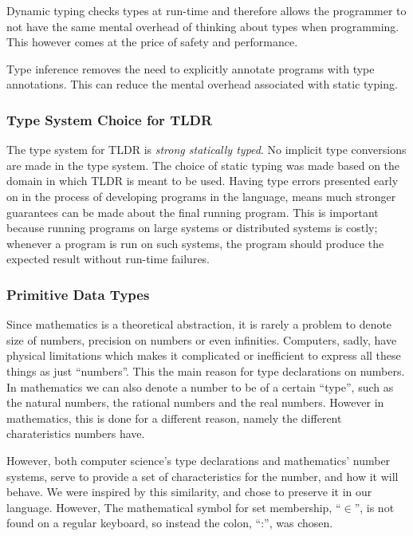 Dynamic typing checks types at run-time and therefore allows the programmer to not have the same mental overhead of thinking about types when programming. This however comes at the price of safety and performance.

Type inference removes the need to explicitly annotate programs with type annotations. This can reduce the mental overhead associated with static typing.

\subsubsection{Type System Choice for TLDR}

The type system for TLDR is \emph{strong statically typed}. No implicit type conversions are made in the type system. The choice of static typing was made based on the domain in which TLDR is meant to be used. Having type errors presented early on in the process of developing programs in the language, means much stronger guarantees can be made about the final running program. This is important because running programs on large systems or distributed systems is costly; whenever a program is run on such systems, the program should produce the expected result without run-time failures.

\subsubsection{Primitive Data Types}
\label{subsec:primitives}

Since mathematics is a theoretical abstraction, it is rarely a problem to denote size of numbers, precision on numbers or even infinities. Computers, sadly, have physical limitations which makes it complicated or inefficient to express all these things as just \enquote{numbers}. This the main reason for type declarations on numbers. In mathematics we can also denote a number to be of a certain \enquote{type}, such as the natural numbers, the rational numbers and the real numbers. However in mathematics, this is done for a different reason, namely the different charateristics numbers have.

However, both computer science's type declarations and mathematics' number systems, serve to provide a set of characteristics for the number, and how it will behave. We were inspired by this similarity, and chose to preserve it in our language. However, The mathematical symbol for set membership, \enquote{$\in$}, is not found on a regular keyboard, so instead the colon, \enquote{:}, was chosen.


